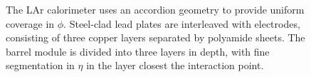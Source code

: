 \begin{figure}[htbp]
	\centering
	\caption{The LAr calorimeter uses an accordion geometry to provide uniform coverage in $\phi$. Steel-clad lead plates are interleaved with electrodes, consisting of three copper layers separated by polyamide sheets. The barrel module is divided into three layers in depth, with fine segmentation in $\eta$ in the layer closest the interaction point.}
	\label{fig:ATLAS-LAr-module}
\end{figure}


